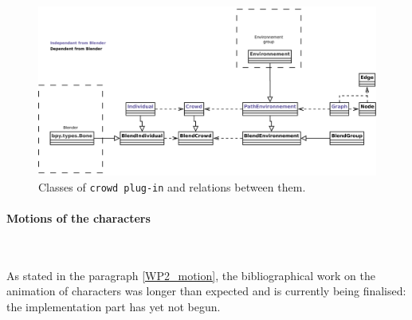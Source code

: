 \begin{figure}[h]
  \includegraphics[width=15cm]{crowd_final.pdf}
  \caption{Classes of \texttt{crowd plug-in} and relations between them.}
  \label{crowd_classes}
\end{figure}

\paragraph{Motions of the characters}~

As stated in the paragraph \ref{WP2_motion}, the bibliographical work on the animation of characters was longer than expected and is currently being finalised: the implementation part has yet not begun.
